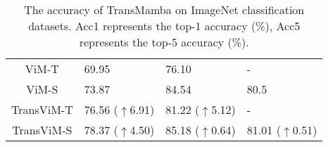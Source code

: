 \begin{table}[]
{\begin{tabular}{c|lll}
{\color[HTML]{808080}ViM-T}                   & {\color[HTML]{808080}69.95}                     & {\color[HTML]{808080}76.10}                        &   {\color[HTML]{808080}-}       \\
{\color[HTML]{808080}ViM-S}                   & {\color[HTML]{808080} 73.87}                          & {\color[HTML]{808080}84.54}                        &  {\color[HTML]{808080}80.5}        \\
TransViM-T              &   76.56  {\color[HTML]{FE0000} ($\uparrow$6.91)}                      & 81.22 {\color[HTML]{FE0000} ($\uparrow$5.12)}                        &    - 
\\
TransViM-S              &   78.37 {\color[HTML]{FE0000} ($\uparrow$4.50)}                        & 85.18 {\color[HTML]{FE0000} ($\uparrow$0.64)}                        &  81.01 {\color[HTML]{FE0000} ($\uparrow$0.51)}         \\ \midrule
\end{tabular}}
\caption{
The accuracy of TransMamba on ImageNet classification datasets. Acc1 represents the top-1 accuracy (\%), Acc5 represents the top-5 accuracy (\%). }
\label{tab:results_imageclassification}
\end{table}